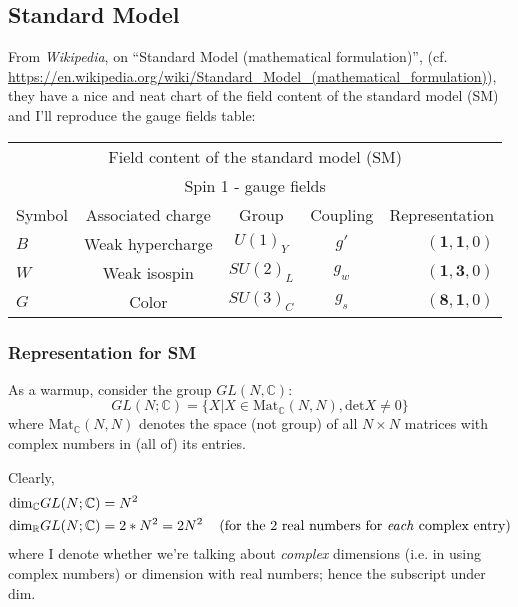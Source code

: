 \documentclass[10pt]{amsart}
\begin{document}
\begin{multicols}{2}
\section{Standard Model}

From \emph{Wikipedia}, on ``Standard Model (mathematical formulation)'', (cf. \url{https://en.wikipedia.org/wiki/Standard_Model_(mathematical_formulation)}), they have a nice and neat chart of the field content of the standard model (SM) and I'll reproduce the gauge fields table:

\begin{tabular}{l c c c r }
\multicolumn{5}{c}{Field content of the standard model (SM)} \\
\multicolumn{5}{c}{Spin 1 - gauge fields } \\
Symbol & Associated charge & Group & Coupling & Representation \\ 
$B$ & Weak hypercharge & $U(1)_Y$ & $g'$ & $( \mathbf{1}, \mathbf{1}, 0)$ \\
$W$ & Weak isospin & $SU(2)_L$ & $g_w$   & $(\mathbf{1}, \mathbf{3} , 0 )$ \\ 
$G$ & Color & $SU(3)_C$ & $g_s$ & $(\mathbf{8}, \mathbf{1}, 0)$  \\
\end{tabular}

\subsubsection{Representation for SM}

As a warmup, consider the group $GL(N,\mathbb{C})$:
\[
GL(N;\mathbb{C}) = \lbrace X | X \in \text{Mat}_{\mathbb{C}}(N,N), \text{det}X \neq 0 \rbrace
\]
where $\text{Mat}_{\mathbb{C}}(N,N)$ denotes the space (not group) of all $N\times N$ matrices with complex numbers in (all of) its entries.

Clearly, 
\[
\begin{aligned}
  & \text{dim}_{\mathbb{C}}GL(N;\mathbb{C}) = N^2 \\ 
  & \text{dim}_{\mathbb{R}}GL(N;\mathbb{C}) = 2*N^2 = 2N^2 \quad \, (\text{for the 2 real numbers for \emph{each} complex entry})
\end{aligned}
\]
where I denote whether we're talking about \emph{complex} dimensions (i.e. in using complex numbers) or dimension with real numbers; hence the subscript under $\text{dim}$.  


\end{multicols}
\end{document}
